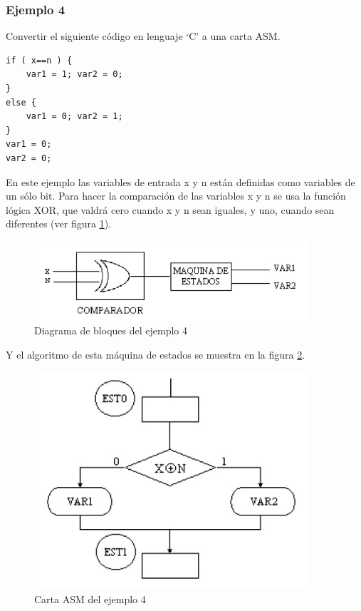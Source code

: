 \documentclass[12pt]{book}
\theoremstyle{definition}
\theoremstyle{remark}
\theoremstyle{plain}
\begin{document}
\subsubsection{Ejemplo 4}

Convertir el siguiente código en lenguaje ‘C’ a una carta ASM.
\begin{verbatim}
if ( x==n ) {
    var1 = 1; var2 = 0;
} 
else {
    var1 = 0; var2 = 1;
}
var1 = 0;
var2 = 0;

\end{verbatim}

En este ejemplo las variables de entrada x y n están definidas como variables de un sólo bit. Para
hacer la comparación de las variables x y n se usa la función lógica XOR, que valdrá cero cuando x
y n sean iguales, y uno, cuando sean diferentes (ver figura \ref{fig24}).

\begin{figure}
\centering
\includegraphics[width=4in]{ASMbloque4.jpg}
\caption{Diagrama de bloques  del ejemplo 4}
\label{fig24}
\end{figure}

Y el algoritmo de esta máquina de estados se muestra en la figura \ref{fig25}.

\begin{figure}
\centering
\includegraphics[width=4in]{ASMejemplo4.jpg}
\caption{Carta ASM  del ejemplo 4}
\label{fig25}
\end{figure}
\end{document}
